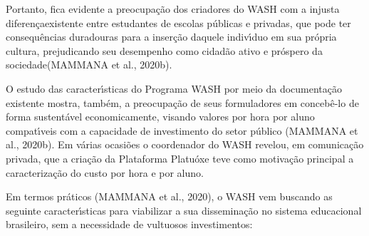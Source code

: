 \documentclass[
12pt,		%
openright,	%
twoside,  %
a4paper,			%
chapter=TITLE,		%
english,			%
french,				%
spanish,			%
brazil				%
]{USPSC-classe/USPSC}
\begin{document}
Portanto, fica evidente a preocupa\c{c}\~ao dos criadores do WASH com a \textquotedbl injusta diferen\c{c}a\textquotedbl  existente entre estudantes de escolas p\'ublicas e privadas, que \textquotedbl pode ter consequ\^encias duradouras para a inser\c{c}\~ao daquele indiv\'{\i}duo em sua pr\'opria cultura, prejudicando seu desempenho como cidad\~ao ativo e pr\'ospero da sociedade\textquotedbl   (MAMMANA et al., 2020b).





\noindent\begin{center}\mbox{\centering{}}\end{center}


O estudo das caracter\'{\i}sticas do Programa WASH por meio da documenta\c{c}\~ao existente mostra, tamb\'em, a preocupa\c{c}\~ao de seus formuladores em conceb\^e-lo de forma sustent\'avel economicamente, visando valores por hora por aluno compat\'{\i}veis com a capacidade de investimento do setor p\'ublico  (MAMMANA et al., 2020b). Em v\'arias ocasi\~oes o coordenador do WASH revelou, em comunica\c{c}\~ao privada, que a cria\c{c}\~ao da Plataforma Platu\'oxe teve como motiva\c{c}\~ao principal a caracteriza\c{c}\~ao do custo por hora e por aluno.




Em termos pr\'aticos  (MAMMANA et al., 2020), o WASH vem buscando as seguinte caracter\'{\i}sticas para viabilizar a sua dissemina\c{c}\~ao no sistema educacional brasileiro, sem a necessidade de vultuosos investimentos:
\end{document}
